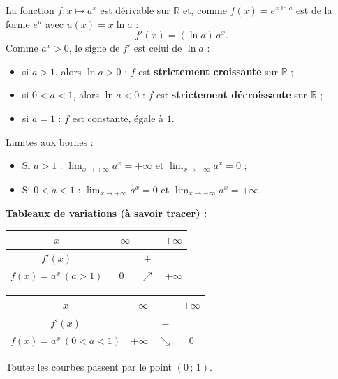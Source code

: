 \documentclass[11pt]{article}
\begin{document}
\begin{propriete}
La fonction $f : x \mapsto a^x$ est dérivable sur $\mathbb{R}$ et, comme $f(x) = e^{x\ln a}$ est de la forme $e^u$ avec $u(x) = x\ln a$ :
\[ f'(x) = (\ln a)\, a^x. \]
Comme $a^x > 0$, le signe de $f'$ est celui de $\ln a$ :
\begin{itemize}
\item si $a > 1$, alors $\ln a > 0$ : $f$ est \textbf{strictement croissante} sur $\mathbb{R}$ ;
\item si $0 < a < 1$, alors $\ln a < 0$ : $f$ est \textbf{strictement décroissante} sur $\mathbb{R}$ ;
\item si $a = 1$ : $f$ est constante, égale à $1$.
\end{itemize}
Limites aux bornes :
\begin{itemize}
\item Si $a > 1$ : $\lim_{x \to +\infty} a^x = +\infty$ et $\lim_{x \to -\infty} a^x = 0$ ;
\item Si $0 < a < 1$ : $\lim_{x \to +\infty} a^x = 0$ et $\lim_{x \to -\infty} a^x = +\infty$.
\end{itemize}
\textbf{Tableaux de variations (à savoir tracer) :}
\begin{center}
\begin{tabular}{|c|ccc|}\hline
$x$ & $-\infty$ & & $+\infty$ \\ \hline
$f'(x)$ & & $+$ & \\ \hline
$f(x)=a^x\ (a>1)$ & $0$ & $\nearrow$ & $+\infty$ \\ \hline
\end{tabular}
\qquad
\begin{tabular}{|c|ccc|}\hline
$x$ & $-\infty$ & & $+\infty$ \\ \hline
$f'(x)$ & & $-$ & \\ \hline
$f(x)=a^x\ (0<a<1)$ & $+\infty$ & $\searrow$ & $0$ \\ \hline
\end{tabular}
\end{center}
Toutes les courbes passent par le point $(0\,;\,1)$.
\end{propriete}
\end{document}
